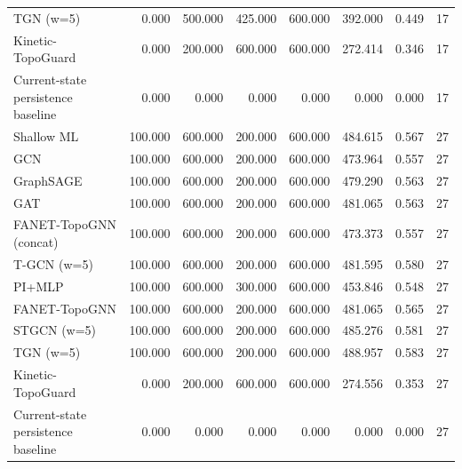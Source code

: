\begin{tabular}{lrrrrrrr}
TGN (w=5) & 0.000 & 500.000 & 425.000 & 600.000 & 392.000 & 0.449 & 17 \\
Kinetic-TopoGuard & 0.000 & 200.000 & 600.000 & 600.000 & 272.414 & 0.346 & 17 \\
Current-state persistence baseline & 0.000 & 0.000 & 0.000 & 0.000 & 0.000 & 0.000 & 17 \\
Shallow ML & 100.000 & 600.000 & 200.000 & 600.000 & 484.615 & 0.567 & 27 \\
GCN & 100.000 & 600.000 & 200.000 & 600.000 & 473.964 & 0.557 & 27 \\
GraphSAGE & 100.000 & 600.000 & 200.000 & 600.000 & 479.290 & 0.563 & 27 \\
GAT & 100.000 & 600.000 & 200.000 & 600.000 & 481.065 & 0.563 & 27 \\
FANET-TopoGNN (concat) & 100.000 & 600.000 & 200.000 & 600.000 & 473.373 & 0.557 & 27 \\
T-GCN (w=5) & 100.000 & 600.000 & 200.000 & 600.000 & 481.595 & 0.580 & 27 \\
PI+MLP & 100.000 & 600.000 & 300.000 & 600.000 & 453.846 & 0.548 & 27 \\
FANET-TopoGNN & 100.000 & 600.000 & 200.000 & 600.000 & 481.065 & 0.565 & 27 \\
STGCN (w=5) & 100.000 & 600.000 & 200.000 & 600.000 & 485.276 & 0.581 & 27 \\
TGN (w=5) & 100.000 & 600.000 & 200.000 & 600.000 & 488.957 & 0.583 & 27 \\
Kinetic-TopoGuard & 0.000 & 200.000 & 600.000 & 600.000 & 274.556 & 0.353 & 27 \\
Current-state persistence baseline & 0.000 & 0.000 & 0.000 & 0.000 & 0.000 & 0.000 & 27 \\
\bottomrule
\end{tabular}